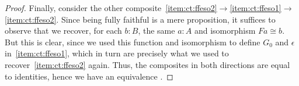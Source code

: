 \begin{proof}
  Finally, consider the other composite~\ref{item:ct:ffeso2}$\to$\ref{item:ct:ffeso1}$\to$\ref{item:ct:ffeso2}.
  Since being fully faithful is a mere proposition, it suffices to observe that we recover, for each $b:B$, the same $a:A$ and isomorphism $F a \cong b$.
  But this is clear, since we used this function and isomorphism to define $G_0$ and $\epsilon$ in~\ref{item:ct:ffeso1}, which in turn are precisely what we used to recover~\ref{item:ct:ffeso2} again.
  Thus, the composites in both directions are equal to identities, hence we have an equivalence \eqv{\text{\ref{item:ct:ffeso1}}}{\text{\ref{item:ct:ffeso2}}}.
\end{proof}
